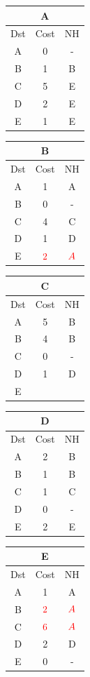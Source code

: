 \documentclass[10pt]{article}
\begin{document}
	\begin{table}[h!]
		\begin{tabular}{|c||c||c|}
 			\hline
	 		\multicolumn{3}{|c|}{A} \\
 			\hline
 			Dst & Cost & NH\\
 			\hline
 			A & 0 & - \\
 			B & 1 & B \\
 			C & 5 & E \\
 			D & 2 & E \\
 			E & 1 & E \\
 			\hline
		\end{tabular}
		\begin{tabular}{|c||c||c|}
 			\hline
	 		\multicolumn{3}{|c|}{B} \\
 			\hline
 			Dst & Cost & NH\\
 			\hline
 			A & 1 & A \\
 			B & 0 & - \\
 			C & 4 & C  \\
 			D & 1 & D \\
 			E & $\color{red} 2$ & $\color{red} A$ \\
 			\hline
		\end{tabular}
		\begin{tabular}{|c||c||c|}
 			\hline
	 		\multicolumn{3}{|c|}{C} \\
 			\hline
 			Dst & Cost & NH\\
 			\hline
 			A & 5 & B \\
 			B & 4 & B \\
 			C & 0 & - \\
 			D & 1 & D \\
 			E &   &   \\
 			\hline
		\end{tabular}
		\begin{tabular}{|c||c||c|}
 			\hline
	 		\multicolumn{3}{|c|}{D} \\
 			\hline
 			Dst & Cost & NH\\
 			\hline
 			A & 2 & B \\
 			B & 1 & B \\
 			C & 1 & C \\
 			D & 0 & - \\
 			E & 2 & E \\
 			\hline
		\end{tabular}
		\begin{tabular}{|c||c||c|}
 			\hline
	 		\multicolumn{3}{|c|}{E} \\
 			\hline
 			Dst & Cost & NH\\
 			\hline
 			A & 1 & A \\
 			B & $\color{red} 2$ & $\color{red} A$ \\
 			C & $\color{red} 6$ & $\color{red} A$ \\
 			D & 2 & D \\
 			E & 0 & - \\
 			\hline
		\end{tabular}
	\end{table}
\end{document}
